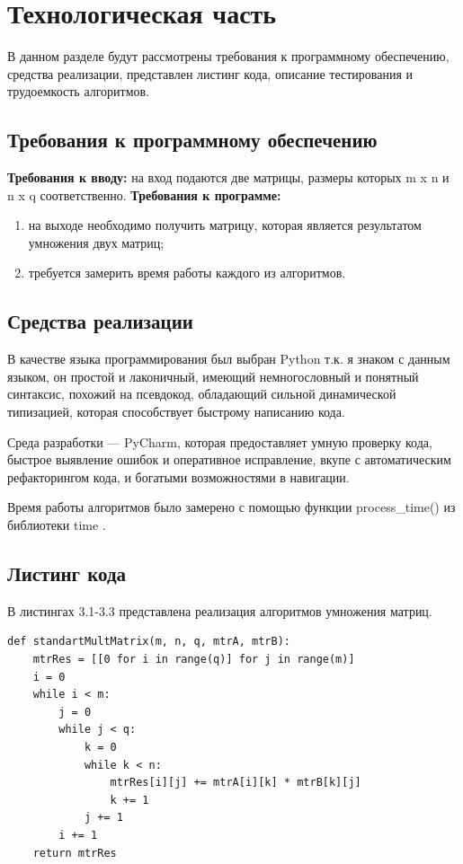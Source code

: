 \documentclass[12pt]{report}
\begin{document}
\chapter{Технологическая часть}
В данном разделе будут рассмотрены требования к программному обеспечению, средства реализации, представлен листинг кода, описание тестирования и трудоемкость алгоритмов.
\section{Требования к программному обеспечению}
\noindent\textbf{Требования к вводу:} на вход подаются две матрицы, размеры которых m x n и n x q соответственно.
\textbf{Требования к программе:}
\begin{enumerate}
	\item на выходе
	необходимо получить матрицу, которая является результатом умножения двух матриц;
	\item требуется замерить время работы
	каждого из алгоритмов. 
\end{enumerate}
\section{Средства реализации}
В качестве языка программирования был выбран Python т.к. я знаком с данным языком, он простой и лаконичный, имеющий немногословный и понятный синтаксис, похожий на псевдокод, обладающий сильной динамической типизацией, которая способствует быстрому написанию кода. 

Среда разработки — PyCharm, которая предоставляет умную проверку кода, быстрое выявление ошибок и оперативное исправление, вкупе с автоматическим рефакторингом кода, и богатыми возможностями в навигации.  

Время  работы алгоритмов было замерено с помощью функции process\_time() из библиотеки time \cite{time}.

\newpage
\section{Листинг кода}

В листингах 3.1-3.3 представлена реализация алгоритмов умножения матриц.
\vspace{\baselineskip}

\begin{lstlisting}[label=some-code,caption=Стандартный алгоритм умножения матриц]
def standartMultMatrix(m, n, q, mtrA, mtrB):
	mtrRes = [[0 for i in range(q)] for j in range(m)]
	i = 0
	while i < m:
		j = 0
		while j < q:
			k = 0
			while k < n:
				mtrRes[i][j] += mtrA[i][k] * mtrB[k][j]
				k += 1
			j += 1
		i += 1
	return mtrRes
\end{lstlisting}
\end{document}
